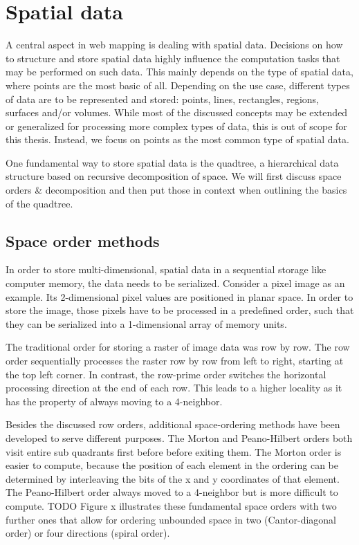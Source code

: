 
%
%

\section{Spatial data}

A central aspect in web mapping is dealing with spatial data. Decisions on how to structure and store spatial data highly influence the computation tasks that may be performed on such data. This mainly depends on the type of spatial data, where points are the most basic of all. Depending on the use case, different types of data are to be represented and stored: points, lines, rectangles, regions, surfaces and/or volumes. While most of the discussed concepts may be extended or generalized for processing more complex types of data, this is out of scope for this thesis. Instead, we focus on points as the most common type of spatial data. \cite{Samet90spatialdata}

One fundamental way to store spatial data is the quadtree, a hierarchical data structure based on recursive decomposition of space. We will first discuss space orders \& decomposition and then put those in context when outlining the basics of the quadtree.

\subsection{Space order methods}

In order to store multi-dimensional, spatial data in a sequential storage like computer memory, the data needs to be serialized. Consider a pixel image as an example. Its 2-dimensional pixel values are positioned in planar space. In order to store the image, those pixels have to be processed in a predefined order, such that they can be serialized into a 1-dimensional array of memory units.

The traditional order for storing a raster of image data was row by row. The row order sequentially processes the raster row by row from left to right, starting at the top left corner. In contrast, the row-prime order switches the horizontal processing direction at the end of each row. This leads to a higher locality as it has the property of always moving to a 4-neighbor. \cite{Goodchild83raster}

Besides the discussed row orders, additional space-ordering methods have been developed to serve different purposes. The Morton and Peano-Hilbert orders both visit entire sub quadrants first before before exiting them. The Morton order is easier to compute, because the position of each element in the ordering can be determined by interleaving the bits of the x and y coordinates of that element. The Peano-Hilbert order always moved to a 4-neighbor but is more difficult to compute. TODO Figure x illustrates these fundamental space orders with two further ones that allow for ordering unbounded space in two (Cantor-diagonal order) or four directions (spiral order). \cite{Samet90spatialdata}

